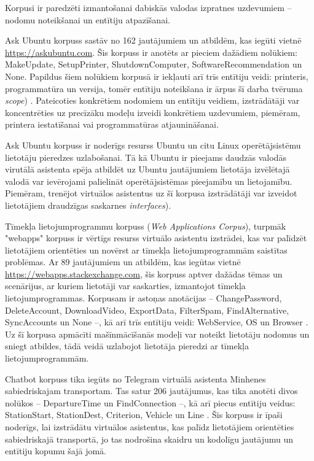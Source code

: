 Korpusi ir paredzēti izmantošanai dabiskās valodas izpratnes uzdevumiem -- nodomu noteikšanai un entītiju atpazīšanai.

Ask Ubuntu korpuss sastāv no 162 jautājumiem un atbildēm, kas iegūti vietnē \url{https://askubuntu.com}. Šis korpuss ir anotēts ar pieciem dažādiem nolūkiem: MakeUpdate, SetupPrinter, ShutdownComputer, SoftwareRecommendation un None. Papildus šiem nolūkiem korpusā ir iekļauti arī trīs entītiju veidi: printeris, programmatūra un versija, tomēr entītiju noteikšana ir ārpus šī darba tvēruma \textit{scope}) \cite{braun-2017}. Pateicoties konkrētiem nodomiem un entītiju veidiem, izstrādātāji var koncentrēties uz precīzāku modeļu izveidi konkrētiem uzdevumiem, piemēram, printera iestatīšanai vai programmatūras atjaunināšanai.

Ask Ubuntu korpuss ir noderīgs resurss Ubuntu un citu Linux operētājsistēmu lietotāju pieredzes uzlabošanai. Tā kā Ubuntu ir pieejams daudzās valodās virutālā asistenta spēja atbildēt uz Ubuntu jautājumiem lietotāja izvēlētajā valodā var ievērojami palielināt operētājsistēmas pieejamību un lietojamību. Piemēram, trenējot virtuālos asistentus uz šī korpusa izstrādātāji var izveidot lietotājiem draudzīgas saskarnes \textit{interfaces}). 


Tīmekļa lietojumprogrammu korpuss (\textit{Web Applications Corpus}), turpmāk "webapps" korpuss ir vērtīgs resurss virtuālo asistentu izstrādei, kas var palīdzēt lietotājiem orientēties un novērst ar tīmekļa lietojumprogrammām saistītas problēmas. Ar 89 jautājumiem un atbildēm, kas iegūtas vietnē \url{https://webapps.stackexchange.com}, šis korpuss aptver dažādas tēmas un scenārijus, ar kuriem lietotāji var saskarties, izmantojot tīmekļa lietojumprogrammas. Korpusam ir astoņas anotācijas -- ChangePassword, DeleteAccount, DownloadVideo, ExportData, FilterSpam, FindAlternative, SyncAccounts un None --, kā arī trīs entītiju veidi: WebService, OS un Browser \cite{braun-2017}. Uz šī korpusa apmācīti mašīnmācīšanās modeļi var noteikt lietotāju nodomus un sniegt atbildes, tādā veidā uzlabojot lietotāja pieredzi ar tīmekļa lietojumprogrammām.



Chatbot korpuss tika iegūts no Telegram virtuālā asistenta Minhenes sabiedriskajam transportam. Tas satur 206 jautājumus, kas tika anotēti divos nolūkos -- DepartureTime un FindConnection --, kā arī piecus entītiju veidus: StationStart, StationDest, Criterion, Vehicle un Line \cite{braun-2017}. Šis korpuss ir īpaši noderīgs, lai izstrādātu virtuālos asistentus, kas palīdz lietotājiem orientēties sabiedriskajā transportā, jo tas nodrošina skaidru un kodolīgu jautājumu un entītiju kopumu šajā jomā. 
